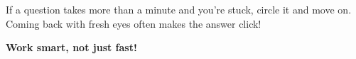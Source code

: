 {\begin{tcolorbox}[
    enhanced,
    colback=funYellowLight,
    colframe=funYellow!60,
    arc=10pt,
    boxrule=1pt,
    left=6mm, right=6mm, top=4mm, bottom=4mm,
]
\vspace{2mm}

If a question takes more than a minute and you're stuck, circle it and move on. Coming back with fresh eyes often makes the answer click!
\end{tcolorbox}

\vspace{4mm}

\begin{center}
{\large\bfseries\color{funGreenDark} \faStopwatch\hspace{2mm}Work smart, not just fast!\hspace{2mm}\faStopwatch}
\end{center}

}
\newpage
